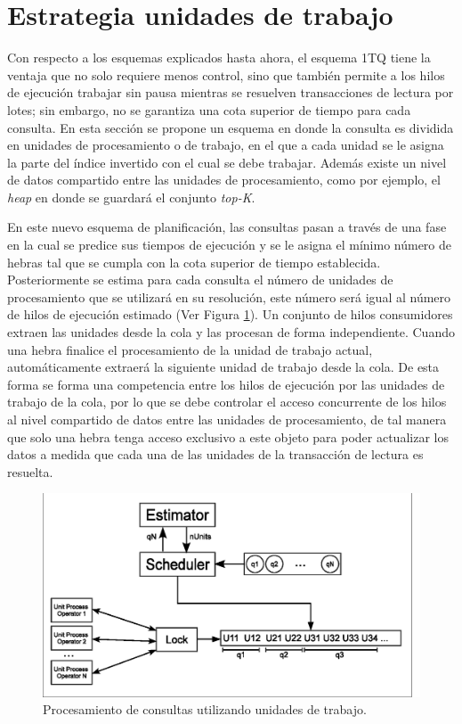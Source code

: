 \section{Estrategia unidades de trabajo}
\label{scheduling:unidadestrabajo}
Con respecto a los esquemas explicados hasta ahora, el esquema 1TQ tiene la ventaja que no solo requiere menos control, sino que también permite a los hilos de ejecución trabajar sin pausa mientras se resuelven transacciones de lectura por lotes; sin embargo, no se garantiza una cota superior de tiempo para cada consulta. En esta sección se propone un esquema en donde la consulta es dividida en unidades de procesamiento o de trabajo, en el que a cada unidad se le asigna la parte del índice invertido con el cual se debe trabajar. Además existe un nivel de datos compartido entre las unidades de procesamiento, como por ejemplo, el \textit{heap} en donde se guardará el conjunto \textit{top-K}.

En este nuevo esquema de planificación, las consultas pasan a través de una fase en la cual se predice sus tiempos de ejecución y se le asigna el mínimo número de hebras tal que se cumpla con la cota superior de tiempo establecida. Posteriormente se estima para cada consulta el número de unidades de procesamiento que se utilizará en su resolución, este número será igual al número de hilos de ejecución estimado (Ver Figura \ref{fig:unit_process}). Un conjunto de hilos consumidores extraen las unidades desde la cola y las procesan de forma independiente. Cuando una hebra finalice el procesamiento de la unidad de trabajo actual, automáticamente extraerá la siguiente unidad de trabajo desde la cola. De esta forma se forma una competencia entre los hilos de ejecución por las unidades de trabajo de la cola, por lo que se debe controlar el acceso concurrente de los hilos al nivel compartido de datos entre las unidades de procesamiento, de tal manera que solo una hebra tenga acceso exclusivo a este objeto para poder actualizar los datos a medida que cada una de las unidades de la transacción de lectura es resuelta.

\begin{figure}[!th]
\centering
\includegraphics[scale=.75]{images/unit_process.eps}
\caption{Procesamiento de consultas utilizando unidades de trabajo.}
\label{fig:unit_process}
\end{figure}

